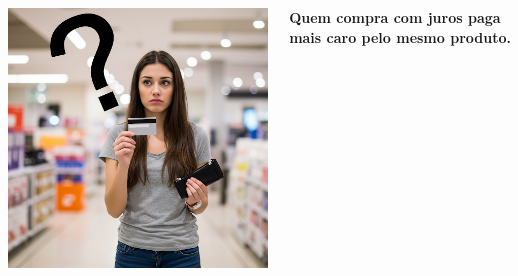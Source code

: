 \begin{frame}[c]
    \frametitle{}
    \begin{columns}
        \begin{column}{0.5\textwidth}
            \includegraphics[width=\textwidth]{../figuras/consumo3.png}
        \end{column}
        \begin{column}{0.5\textwidth}
            \centering
            \textbf{\Large Quem compra com juros paga mais caro pelo mesmo produto.}
        \end{column}
    \end{columns}
\end{frame}

